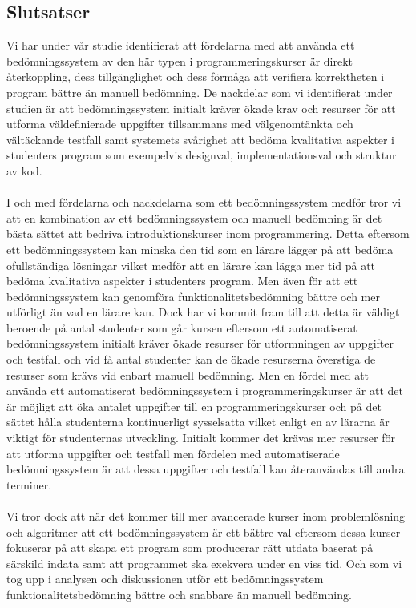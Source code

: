 \documentclass[a4paper,11pt]{article}
\begin{document}
{\subsection{Slutsatser}

Vi har under vår studie identifierat att fördelarna med att använda ett bedömningssystem av den här typen i programmeringskurser är direkt återkoppling, dess tillgänglighet och dess förmåga att verifiera korrektheten i program bättre än manuell bedömning. De nackdelar som vi identifierat under studien är att bedömningssystem initialt kräver ökade krav och resurser för att utforma väldefinierade uppgifter tillsammans med välgenomtänkta och vältäckande testfall samt systemets svårighet att bedöma kvalitativa aspekter i studenters program som exempelvis designval, implementationsval och struktur av kod.
\\
\\
I och med fördelarna och nackdelarna som ett bedömningssystem medför tror vi att en kombination av ett bedömningssystem och manuell bedömning är det bästa sättet att bedriva introduktionskurser inom programmering. Detta eftersom ett bedömningssystem kan minska den tid som en lärare lägger på att bedöma ofullständiga lösningar vilket medför att en lärare kan lägga mer tid på att bedöma kvalitativa aspekter i studenters program. Men även för att ett bedömningssystem kan genomföra funktionalitetsbedömning bättre och mer utförligt än vad en lärare kan. Dock har vi kommit fram till att detta är väldigt beroende på antal studenter som går kursen eftersom ett automatiserat bedömningssystem initialt kräver ökade resurser för utformningen av uppgifter och testfall och vid få antal studenter kan de ökade resurserna överstiga de resurser som krävs vid enbart manuell bedömning. Men en fördel med att använda ett automatiserat bedömningssystem i programmeringskurser är att det är möjligt att öka antalet uppgifter till en programmeringskurser och på det sättet hålla studenterna kontinuerligt sysselsatta vilket enligt en av lärarna är viktigt för studenternas utveckling. Initialt kommer det krävas mer resurser för att utforma uppgifter och testfall men fördelen med automatiserade bedömningssystem är att dessa uppgifter och testfall kan återanvändas till andra terminer.
\\
\\
Vi tror dock att när det kommer till mer avancerade kurser inom problemlösning och algoritmer att ett bedömningssystem är ett bättre val eftersom dessa kurser fokuserar på att skapa ett program som producerar rätt utdata baserat på särskild indata samt att programmet ska exekvera under en viss tid. Och som vi tog upp i analysen och diskussionen utför ett bedömningssystem funktionalitetsbedömning bättre och snabbare än manuell bedömning.

}
\end{document}
